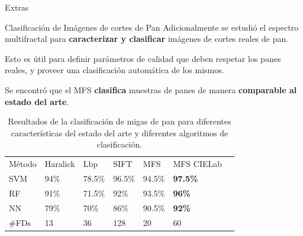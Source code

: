 \documentclass[spanish,unknownkeysallowed]{beamer}
\begin{document}
\begin{frame}
\begin{block}{}
\begin{center}
\vspace{1cm}
\huge{Extras}
\vspace{1cm}
\end{center}
\end{block}
\end{frame}

\begin{frame}{Clasificación de Imágenes de cortes de Pan}
Adicionalmente se estudió el espectro multifractal para \textbf{caracterizar y clasificar} imágenes de cortes reales de pan.

\vspace{0.3cm}

Esto es útil para definir parámetros de calidad que deben respetar los panes reales, y proveer una clasificación automática de los mismos.

\vspace{0.3cm}

Se encontró que el MFS \textbf{clasifica} muestras de panes de manera \textbf{comparable al estado del arte}.

\end{frame}

\begin{frame}
\begin{table}[h!]
\center
\begin{tabular}{lllllll}
\hline\noalign{\smallskip}
Método & Haralick & Lbp & SIFT & MFS & MFS CIELab\\ %
\noalign{\smallskip}\hline\noalign{\smallskip}
SVM & 94\% & 78.5\% & 96.5\% & 94.5\% & \textbf{97.5\%} \\
RF  & 91\% & 71.5\% & 92\% & 93.5\% & \textbf{96\%} \\
NN & 79\% & 70\% & 86\%  & 90.5\% & \textbf{92\%} \\
\noalign{\smallskip}\hline
\#FDs & 13 & 36 & 128 & 20 & 60\\
\hline
\end{tabular}
\caption{Resultados de la clasificación de migas de pan para diferentes características del estado del arte y diferentes algoritmos de clasificación.}
\label{tab:other} 
\end{table}
\end{frame}
\end{document}
